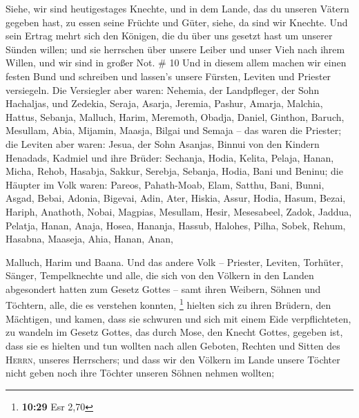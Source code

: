  Siehe, wir sind heutigestages Knechte, und in dem Lande,
das du unseren Vätern gegeben hast, zu essen seine Früchte und Güter,
siehe, da sind wir Knechte.  Und sein Ertrag mehrt sich
den Königen, die du über uns gesetzt hast um unserer Sünden willen; und
sie herrschen über unsere Leiber und unser Vieh nach ihrem Willen, und
wir sind in großer Not. \# 10  Und in diesem allem machen
wir einen festen Bund und schreiben und lassen's unsere Fürsten, Leviten
und Priester versiegeln.  Die Versiegler aber waren:
Nehemia, der Landpfleger, der Sohn Hachaljas, und Zedekia,
 Seraja, Asarja, Jeremia,  Pashur, Amarja,
Malchia,  Hattus, Sebanja, Malluch,  Harim,
Meremoth, Obadja,  Daniel, Ginthon, Baruch, 
Mesullam, Abia, Mijamin,  Maasja, Bilgai und Semaja -- das
waren die Priester;  die Leviten aber waren: Jesua, der
Sohn Asanjas, Binnui von den Kindern Henadads, Kadmiel 
und ihre Brüder: Sechanja, Hodia, Kelita, Pelaja, Hanan, 
Micha, Rehob, Hasabja,  Sakkur, Serebja, Sebanja,
 Hodia, Bani und Beninu;  die Häupter im
Volk waren: Pareos, Pahath-Moab, Elam, Satthu, Bani, 
Bunni, Asgad, Bebai,  Adonia, Bigevai, Adin,
 Ater, Hiskia, Assur,  Hodia, Hasum,
Bezai,  Hariph, Anathoth, Nobai,  Magpias,
Mesullam, Hesir,  Mesesabeel, Zadok, Jaddua,
 Pelatja, Hanan, Anaja,  Hosea, Hananja,
Hassub,  Halohes, Pilha, Sobek,  Rehum,
Hasabna, Maaseja,  Ahia, Hanan, Anan,

 Malluch, Harim und Baana.  Und das andere
Volk -- Priester, Leviten, Torhüter, Sänger, Tempelknechte und alle, die
sich von den Völkern in den Landen abgesondert hatten zum Gesetz Gottes
-- samt ihren Weibern, Söhnen und Töchtern, alle, die es verstehen
konnten, \footnote{\textbf{10:29} Esr 2,70}  hielten sich
zu ihren Brüdern, den Mächtigen, und kamen, dass sie schwuren und sich
mit einem Eide verpflichteten, zu wandeln im Gesetz Gottes, das durch
Mose, den Knecht Gottes, gegeben ist, dass sie es hielten und tun
wollten nach allen Geboten, Rechten und Sitten des \textsc{Herrn},
unseres Herrschers;  und dass wir den Völkern im Lande
unsere Töchter nicht geben noch ihre Töchter unseren Söhnen nehmen
wollten;

